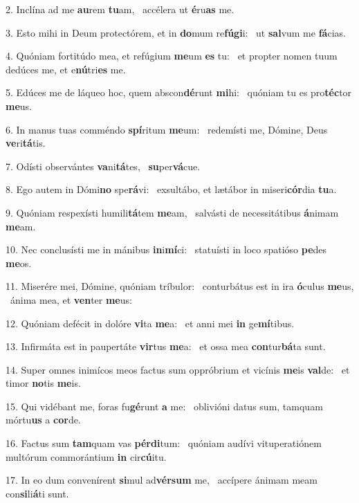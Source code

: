2. Inclína ad me \textbf{au}rem \textbf{tu}am, \ast\  accélera ut \textbf{é}ru\textbf{as} me.\

3. Esto mihi in Deum protectórem, et in \textbf{do}mum re\textbf{fú}\textbf{gi}i: \ast\  ut \textbf{sal}vum me \textbf{fá}cias.\

4. Quóniam fortitúdo mea, et refúgium \textbf{me}um \textbf{es} tu: \ast\  et propter nomen tuum dedúces me, et e\textbf{nú}tri\textbf{es} me.\

5. Edúces me de láqueo hoc, quem abscon\textbf{dé}runt \textbf{mi}hi: \ast\  quóniam tu es pro\textbf{téc}tor \textbf{me}us.\

6. In manus tuas comméndo \textbf{spí}ritum \textbf{me}um: \ast\  redemísti me, Dómine, Deus \textbf{ve}ri\textbf{tá}tis.\

7. Odísti observántes \textbf{va}ni\textbf{tá}tes, \ast\  \textbf{su}per\textbf{vá}cue.\

8. Ego autem in Dómi\textbf{no} spe\textbf{rá}vi: \ast\  exsultábo, et lætábor in miseri\textbf{cór}dia \textbf{tu}a.\

9. Quóniam respexísti humili\textbf{tá}tem \textbf{me}am, \ast\  salvásti de necessitátibus \textbf{á}nimam \textbf{me}am.\

10. Nec conclusísti me in mánibus \textbf{in}i\textbf{mí}ci: \ast\  statuísti in loco spatióso \textbf{pe}des \textbf{me}os.\

11. Miserére mei, Dómine, quóniam tríbulor: \dag\  conturbátus est in ira \textbf{ó}culus \textbf{me}us, \ast\  ánima mea, et \textbf{ven}ter \textbf{me}us:\

12. Quóniam defécit in dolóre \textbf{vi}ta \textbf{me}a: \ast\  et anni mei \textbf{in} ge\textbf{mí}tibus.\

13. Infirmáta est in paupertáte \textbf{vir}tus \textbf{me}a: \ast\  et ossa mea \textbf{con}tur\textbf{bá}ta sunt.\

14. Super omnes inimícos meos factus sum oppróbrium et vicínis \textbf{me}is \textbf{val}de: \ast\  et timor \textbf{no}tis \textbf{me}is.\

15. Qui vidébant me, foras fu\textbf{gé}runt \textbf{a} me: \ast\  oblivióni datus sum, tamquam mórtu\textbf{us} a \textbf{cor}de.\

16. Factus sum \textbf{tam}quam vas \textbf{pér}\textbf{di}tum: \ast\  quóniam audívi vituperatiónem multórum commorántium \textbf{in} cir\textbf{cú}itu.\

17. In eo dum convenírent \textbf{si}mul ad\textbf{vér}\textbf{sum} me, \ast\  accípere ánimam meam con\textbf{si}li\textbf{á}ti sunt.\


